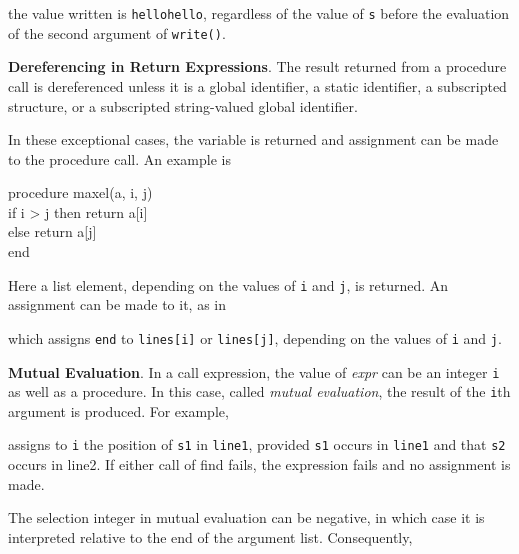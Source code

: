 
\noindent the value written is \texttt{hellohello}, regardless of the
value of \texttt{s} before the evaluation of the second argument of
\texttt{write()}.


\textbf{Dereferencing in Return Expressions}. The result returned from
a procedure call is dereferenced unless it is a global identifier, a
static identifier, a subscripted structure, or a subscripted
string-valued global identifier.

In these exceptional cases, the variable is returned and assignment
can be made to the procedure call. An example is

\begin{iconcode}
\>procedure maxel(a, i, j)\\
\>\>if i > j then return a[i]\\
\>\>else return a[j]\\
\>end
\end{iconcode}

Here a list element, depending on the values of \texttt{i} and
\texttt{j}, is returned. An assignment can be made to it, as in


\noindent which assigns \texttt{{\textquotedbl}end{\textquotedbl}} to
\texttt{lines[i]} or \texttt{lines[j]}, depending on the values of
\texttt{i} and \texttt{j}.


\textbf{Mutual Evaluation}. In a call expression, the value of
\textit{expr}\textit{} can be an integer
\texttt{i} as well as a procedure. In this case, called
\textit{mutual evaluation}, the result of the \texttt{i}th
argument is produced. For example,


\noindent assigns to \texttt{i} the position of \texttt{s1} in
\texttt{line1}, provided \texttt{s1} occurs in \texttt{line1} and that
\texttt{s2} occurs in line2. If either call of find fails, the
expression fails and no assignment is made.

The selection integer in mutual evaluation can be negative, in which
case it is interpreted relative to the end of the argument
list. Consequently,


